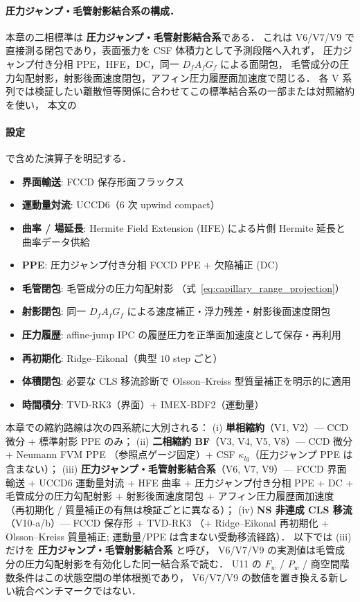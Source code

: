 \paragraph{圧力ジャンプ・毛管射影結合系の構成．}
本章の二相標準は \textbf{圧力ジャンプ・毛管射影結合系}である．
これは V6/V7/V9 で直接測る閉包であり，表面張力を CSF 体積力として予測段階へ入れず，
圧力ジャンプ付き分相 PPE，HFE，DC，同一 $D_fA_fG_f$ による面閉包，
毛管成分の圧力勾配射影，射影後面速度閉包，アフィン圧力履歴面加速度で閉じる．
各 V 系列では検証したい離散恒等関係に合わせてこの標準結合系の一部または対照縮約を使い，
本文の \paragraph{設定} で含めた演算子を明記する．
\begin{itemize}\setlength{\itemsep}{0pt}
  \item \textbf{界面輸送}: FCCD 保存形面フラックス
  \item \textbf{運動量対流}: UCCD6（6 次 upwind compact）
  \item \textbf{曲率 / 場延長}: Hermite Field Extension (HFE) による片側 Hermite 延長と曲率データ供給
  \item \textbf{PPE}: 圧力ジャンプ付き分相 FCCD PPE + 欠陥補正 (DC)
  \item \textbf{毛管閉包}: 毛管成分の圧力勾配射影
        （式~\eqref{eq:capillary_range_projection}）
  \item \textbf{射影閉包}: 同一 $D_fA_fG_f$ による速度補正・浮力残差・射影後面速度閉包
  \item \textbf{圧力履歴}: affine-jump IPC の履歴圧力を正準面加速度として保存・再利用
  \item \textbf{再初期化}: Ridge--Eikonal（典型 $10$ step ごと）
  \item \textbf{体積閉包}: 必要な CLS 移流診断で Olsson--Kreiss 型質量補正を明示的に適用
  \item \textbf{時間積分}: TVD-RK3（界面）+ IMEX-BDF2（運動量）
\end{itemize}
本章での縮約路線は次の四系統に大別される：
(i) \textbf{単相縮約}（V1, V2）— CCD 微分 + 標準射影 PPE のみ；
(ii) \textbf{二相縮約 BF}（V3, V4, V5, V8）— CCD 微分 + Neumann FVM PPE
（参照点ゲージ固定）+ CSF $\kappa_{lg}$（圧力ジャンプ PPE は含まない）；
(iii) \textbf{圧力ジャンプ・毛管射影結合系}（V6, V7, V9）— FCCD 界面輸送
+ UCCD6 運動量対流 + HFE 曲率 + 圧力ジャンプ付き分相
PPE + DC + 毛管成分の圧力勾配射影 + 射影後面速度閉包 + アフィン圧力履歴面加速度
（再初期化 / 質量補正の有無は検証ごとに異なる）；
(iv) \textbf{NS 非連成 CLS 移流}（V10-a/b）— FCCD 保存形 + TVD-RK3
（+ Ridge--Eikonal 再初期化 + Olsson--Kreiss 質量補正; 運動量/PPE
は含まない受動移流経路）．
以下では (iii) だけを \textbf{圧力ジャンプ・毛管射影結合系} と呼び，
V6/V7/V9 の実測値は毛管成分の圧力勾配射影を有効化した同一結合系で読む．
U11 の $F_w$ / $P_w$ / 商空間階数条件はこの状態空間の単体根拠であり，
V6/V7/V9 の数値を置き換える新しい統合ベンチマークではない．

